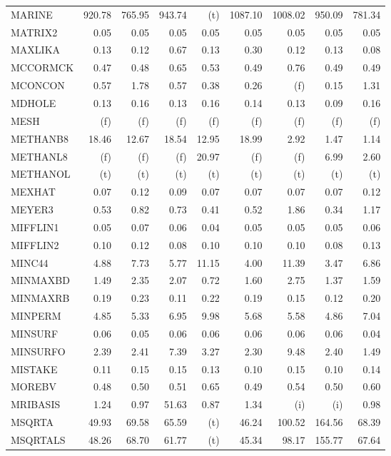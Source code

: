 \documentclass[11pt,twoside]{article}
\begin{document}
{\begin{longtable}[c]{|l|r|r|r|r|r|r|r|r|}
MARINE & 920.78 & 765.95 & 943.74 & (t) & 1087.10 & 1008.02 & 950.09 & 781.34 \\
MATRIX2 & 0.05 & 0.05 & 0.05 & 0.05 & 0.05 & 0.05 & 0.05 & 0.05 \\
MAXLIKA & 0.13 & 0.12 & 0.67 & 0.13 & 0.30 & 0.12 & 0.13 & 0.08 \\
MCCORMCK & 0.47 & 0.48 & 0.65 & 0.53 & 0.49 & 0.76 & 0.49 & 0.49 \\
MCONCON & 0.57 & 1.78 & 0.57 & 0.38 & 0.26 & (f) & 0.15 & 1.31 \\
MDHOLE & 0.13 & 0.16 & 0.13 & 0.16 & 0.14 & 0.13 & 0.09 & 0.16 \\
MESH & (f) & (f) & (f) & (f) & (f) & (f) & (f) & (f) \\
METHANB8 & 18.46 & 12.67 & 18.54 & 12.95 & 18.99 & 2.92 & 1.47 & 1.14 \\
METHANL8 & (f) & (f) & (f) & 20.97 & (f) & (f) & 6.99 & 2.60 \\
METHANOL & (t) & (t) & (t) & (t) & (t) & (t) & (t) & (t) \\
MEXHAT & 0.07 & 0.12 & 0.09 & 0.07 & 0.07 & 0.07 & 0.07 & 0.12 \\
MEYER3 & 0.53 & 0.82 & 0.73 & 0.41 & 0.52 & 1.86 & 0.34 & 1.17 \\
MIFFLIN1 & 0.05 & 0.07 & 0.06 & 0.04 & 0.05 & 0.05 & 0.05 & 0.06 \\
MIFFLIN2 & 0.10 & 0.12 & 0.08 & 0.10 & 0.10 & 0.10 & 0.08 & 0.13 \\
MINC44 & 4.88 & 7.73 & 5.77 & 11.15 & 4.00 & 11.39 & 3.47 & 6.86 \\
MINMAXBD & 1.49 & 2.35 & 2.07 & 0.72 & 1.60 & 2.75 & 1.37 & 1.59 \\
MINMAXRB & 0.19 & 0.23 & 0.11 & 0.22 & 0.19 & 0.15 & 0.12 & 0.20 \\
MINPERM & 4.85 & 5.33 & 6.95 & 9.98 & 5.68 & 5.58 & 4.86 & 7.04 \\
MINSURF & 0.06 & 0.05 & 0.06 & 0.06 & 0.06 & 0.06 & 0.06 & 0.04 \\
MINSURFO & 2.39 & 2.41 & 7.39 & 3.27 & 2.30 & 9.48 & 2.40 & 1.49 \\
MISTAKE & 0.11 & 0.15 & 0.15 & 0.13 & 0.10 & 0.15 & 0.10 & 0.14 \\
MOREBV & 0.48 & 0.50 & 0.51 & 0.65 & 0.49 & 0.54 & 0.50 & 0.60 \\
MRIBASIS & 1.24 & 0.97 & 51.63 & 0.87 & 1.34 & (i) & (i) & 0.98 \\
MSQRTA & 49.93 & 69.58 & 65.59 & (t) & 46.24 & 100.52 & 164.56 & 68.39 \\
MSQRTALS & 48.26 & 68.70 & 61.77 & (t) & 45.34 & 98.17 & 155.77 & 67.64 \\

\end{longtable}}
\end{document}
